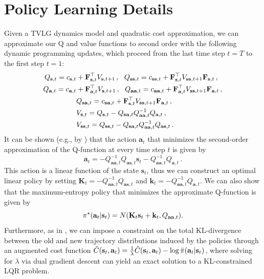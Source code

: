 \section{Policy Learning Details}
\label{sec:supp-lqr}

Given a TVLG dynamics model and quadratic cost approximation, we can approximate our Q and value functions to second order with the following dynamic programming updates, which proceed from the last time step $t = T$ to the first step $t = 1$:
\begin{align*}
    Q_{\mathbf{s},t}=c_{\mathbf{s},t}&+\mathbf{F}_{\mathbf{s},t}^\top{V}_{\mathbf{s},t+1}\,,~~Q_{\mathbf{ss},t}=c_{\mathbf{ss},t}+\mathbf{F}_{\mathbf{s},t}^\top{V}_{\mathbf{ss},t+1}\mathbf{F}_{\mathbf{s},t}\,,\\
    Q_{\mathbf{a},t}=c_{\mathbf{a},t}&+\mathbf{F}_{\mathbf{a},t}^\top{V}_{\mathbf{s},t+1}\,,~~Q_{\mathbf{aa},t}=c_{\mathbf{aa},t}+\mathbf{F}_{\mathbf{a},t}^\top{V}_{\mathbf{ss},t+1}\mathbf{F}_{\mathbf{a},t}\,,\\
    &Q_{\mathbf{sa},t}=c_{\mathbf{sa},t}+\mathbf{F}_{\mathbf{s},t}^\top{V}_{\mathbf{ss},t+1}\mathbf{F}_{\mathbf{a},t}\,,\\
    &V_{\mathbf{s},t}=Q_{\mathbf{s},t}-Q_{\mathbf{sa},t}Q_{\mathbf{aa},t}^{-1}Q_{\mathbf{a},t}\,,\\
    &V_{\mathbf{ss},t}=Q_{\mathbf{ss},t}-Q_{\mathbf{sa},t}Q_{\mathbf{aa},t}^{-1}Q_{\mathbf{as},t}\,.
\end{align*}
It can be shown (e.g., by \citet{synthesis}) that the action $\mathbf{a}_t$ that minimizes the second-order approximation of the Q-function at every time step $t$ is given by
\[
\mathbf{a}_t=-Q_{\mathbf{aa},t}^{-1}Q_{\mathbf{as},t}\mathbf{s}_t-Q_{\mathbf{aa},t}^{-1}Q_{\mathbf{a},t}\,.
\]
This action is a linear function of the state $\mathbf{s}_t$, thus we can construct an optimal linear policy by setting $\mathbf{K}_t=-Q_{\mathbf{aa},t}^{-1}Q_{\mathbf{as},t}$ and $\mathbf{k}_t=-Q_{\mathbf{aa},t}^{-1}Q_{\mathbf{a},t}$. We can also show that the maximum-entropy policy that minimizes the approximate Q-function is given by
\[
\pi^\star(\mathbf{a}_t|\mathbf{s}_t)=N(\mathbf{K}_t\mathbf{s}_t+\mathbf{k}_t,Q_{\mathbf{aa},t}).
\]
Furthermore, as in \citet{mfcgps}, we can impose a constraint on the total KL-divergence between the old and new trajectory distributions induced by the policies through an augmented cost function $\tilde{C}(\mathbf{s}_t,\mathbf{a}_t)=\frac{1}{\lambda}\hat{C}(\mathbf{s}_t,\mathbf{a}_t)-\log\bar{\pi}(\mathbf{a}_t|\mathbf{s}_t)$, where solving for $\lambda$ via dual gradient descent can yield an exact solution to a KL-constrained LQR problem.


